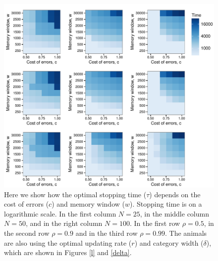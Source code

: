 \begin{figure}
\includegraphics[width=6.85in]{figures/time_heat_maps.pdf}
\caption{\sffamily\small\textbf{} Here we show how the optimal stopping time ($\tau$) depends on the cost of errors ($c$) and memory window ($w$). Stopping time is on a logarithmic scale. In the first column $N=25$, in the middle column $N=50$, and in the right column $N=100$. In the first row $\rho=0.5$, in the second row $\rho=0.9$ and in the third row $\rho=0.99$. The animals are also using the optimal updating rate ($r$) and category width ($\delta$), which are shown in Figures \ref{l} and \ref{delta}.}
\label{time}
\end{figure}

